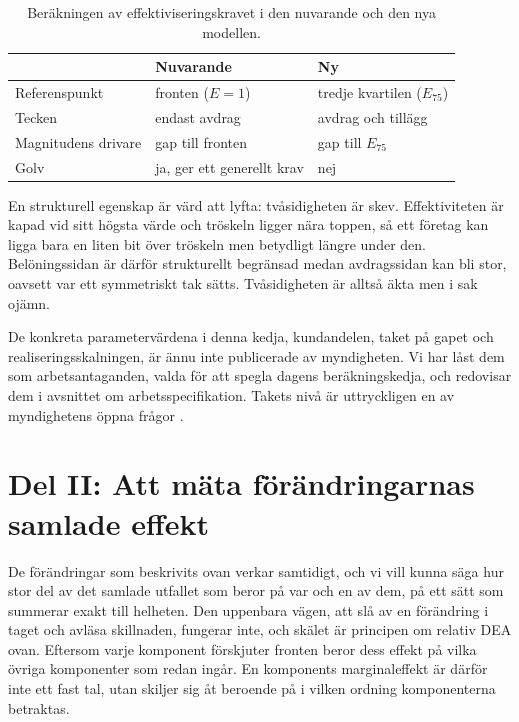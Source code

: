 \documentclass[11pt,a4paper]{article}
\begin{document}
\begin{table}[h]
  \centering
  \caption{Beräkningen av effektiviseringskravet i den nuvarande och den nya modellen.}
  \label{tab:krav}
  \begin{tabular}{lll}
    \toprule
                          & Nuvarande                & Ny \\
    \midrule
    Referenspunkt         & fronten ($E = 1$)        & tredje kvartilen ($E_{75}$) \\
    Tecken                & endast avdrag            & avdrag och tillägg \\
    Magnitudens drivare   & gap till fronten         & gap till $E_{75}$ \\
    Golv                  & ja, ger ett generellt krav & nej \\
    \bottomrule
  \end{tabular}
\end{table}

En strukturell egenskap är värd att lyfta: tvåsidigheten är skev. Effektiviteten är kapad vid sitt
högsta värde och tröskeln ligger nära toppen, så ett företag kan ligga bara en liten bit över
tröskeln men betydligt längre under den. Belöningssidan är därför strukturellt begränsad medan
avdragssidan kan bli stor, oavsett var ett symmetriskt tak sätts. Tvåsidigheten är alltså äkta men
i sak ojämn.

De konkreta parametervärdena i denna kedja, kundandelen, taket på gapet och realiseringsskalningen,
är ännu inte publicerade av myndigheten. Vi har låst dem som arbetsantaganden, valda för att spegla
dagens beräkningskedja, och redovisar dem i avsnittet om arbetsspecifikation. Takets nivå är
uttryckligen en av myndighetens öppna frågor \citeyearpar{Ei2026Effektivisering}.

\section{Del II: Att mäta förändringarnas samlade effekt}

De förändringar som beskrivits ovan verkar samtidigt, och vi vill kunna säga hur stor del av det
samlade utfallet som beror på var och en av dem, på ett sätt som summerar exakt till helheten. Den
uppenbara vägen, att slå av en förändring i taget och avläsa skillnaden, fungerar inte, och skälet
är principen om relativ DEA ovan. Eftersom varje komponent förskjuter fronten beror dess effekt på
vilka övriga komponenter som redan ingår. En komponents marginaleffekt är därför inte ett fast tal,
utan skiljer sig åt beroende på i vilken ordning komponenterna betraktas.
\end{document}
